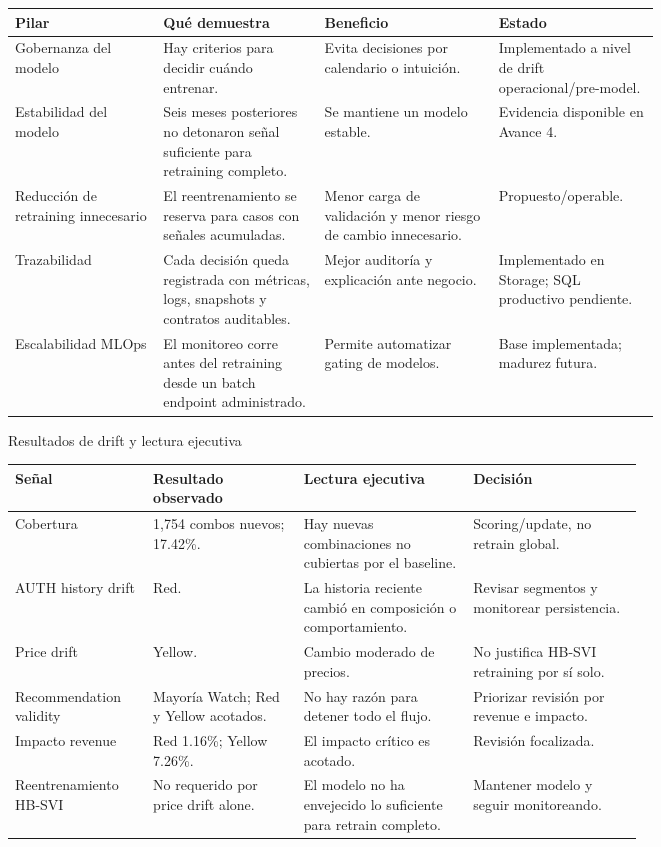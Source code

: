 \documentclass[11pt,letterpaper]{article}
\makeatletter
\renewcommand\section{\@startsection{section}{1}{\z@}
  {-3.5ex \@plus -1ex \@minus -.2ex}
  {2.3ex \@plus .2ex}
  {\Large\bfseries\sffamily\color{azulTec}}}
\makeatother
\begin{document}
\begin{tabularx}{\linewidth}{L{0.23\linewidth}L{0.25\linewidth}L{0.27\linewidth}Y}
\toprule
\textbf{Pilar} & \textbf{Qué demuestra} & \textbf{Beneficio} & \textbf{Estado} \\
\midrule
Gobernanza del modelo & Hay criterios para decidir cuándo entrenar. & Evita decisiones por calendario o intuición. & Implementado a nivel de drift operacional/pre-model. \\
Estabilidad del modelo & Seis meses posteriores no detonaron señal suficiente para retraining completo. & Se mantiene un modelo estable. & Evidencia disponible en Avance 4. \\
Reducción de retraining innecesario & El reentrenamiento se reserva para casos con señales acumuladas. & Menor carga de validación y menor riesgo de cambio innecesario. & Propuesto/operable. \\
Trazabilidad & Cada decisión queda registrada con métricas, logs, snapshots y contratos auditables. & Mejor auditoría y explicación ante negocio. & Implementado en Storage; SQL productivo pendiente. \\
Escalabilidad MLOps & El monitoreo corre antes del retraining desde un batch endpoint administrado. & Permite automatizar gating de modelos. & Base implementada; madurez futura. \\
\bottomrule
\end{tabularx}

\section{Resultados de drift y lectura ejecutiva}

\begin{tabularx}{\linewidth}{L{0.22\linewidth}L{0.24\linewidth}L{0.27\linewidth}Y}
\toprule
\textbf{Señal} & \textbf{Resultado observado} & \textbf{Lectura ejecutiva} & \textbf{Decisión} \\
\midrule
Cobertura & 1,754 combos nuevos; 17.42\%. & Hay nuevas combinaciones no cubiertas por el baseline. & Scoring/update, no retrain global. \\
AUTH history drift & Red. & La historia reciente cambió en composición o comportamiento. & Revisar segmentos y monitorear persistencia. \\
Price drift & Yellow. & Cambio moderado de precios. & No justifica HB-SVI retraining por sí solo. \\
Recommendation validity & Mayoría Watch; Red y Yellow acotados. & No hay razón para detener todo el flujo. & Priorizar revisión por revenue e impacto. \\
Impacto revenue & Red 1.16\%; Yellow 7.26\%. & El impacto crítico es acotado. & Revisión focalizada. \\
Reentrenamiento HB-SVI & No requerido por price drift alone. & El modelo no ha envejecido lo suficiente para retrain completo. & Mantener modelo y seguir monitoreando. \\
\bottomrule
\end{tabularx}
\end{document}
